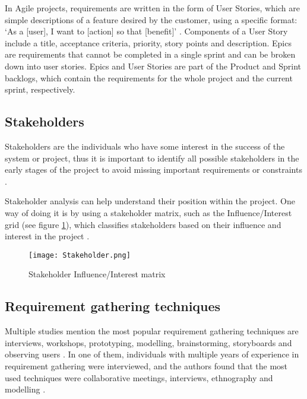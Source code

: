 In Agile projects, requirements are written in the form of User Stories, which are simple descriptions of a feature desired by the customer, using a specific format: `As a [user], I want to [action] so that [benefit]' \parencite[191]{requirements}. Components of a User Story include a title, acceptance criteria, priority, story points and description. Epics are requirements that cannot be completed in a single sprint and can be broken down into user stories. Epics and User Stories are part of the Product and Sprint backlogs, which contain the requirements for the whole project and the current sprint, respectively.

\subsection{Stakeholders}
\label{sec:stakeholders}

Stakeholders are the individuals who have some interest in the success of the system or project, thus it is important to identify all possible stakeholders in the early stages of the project to avoid missing important requirements or constraints \parencite[34]{requirements}. 

Stakeholder analysis can help understand their position within the project. One way of doing it is by using a stakeholder matrix, such as the Influence/Interest grid (see figure \ref{fig:stakeholder_matrix}), which classifies stakeholders based on their influence and interest in the project \parencite{stakeholders,stakeholders2}.

\begin{figure}[ht]
    \centering
    \texttt{[image: Stakeholder.png]}
    \caption{Stakeholder Influence/Interest matrix}
    \label{fig:stakeholder_matrix}
\end{figure}

\subsection{Requirement gathering techniques}

Multiple studies mention the most popular requirement gathering techniques are interviews, workshops, prototyping, modelling, brainstorming, storyboards and observing users \parencite{reqanalysis1,reqanalysis2, reqanalysis3, reqanalysis4}. In one of them, individuals with multiple years of experience in requirement gathering were interviewed, and the authors found that the most used techniques were collaborative meetings, interviews, ethnography and modelling \parencite{reqanalysis1}.

